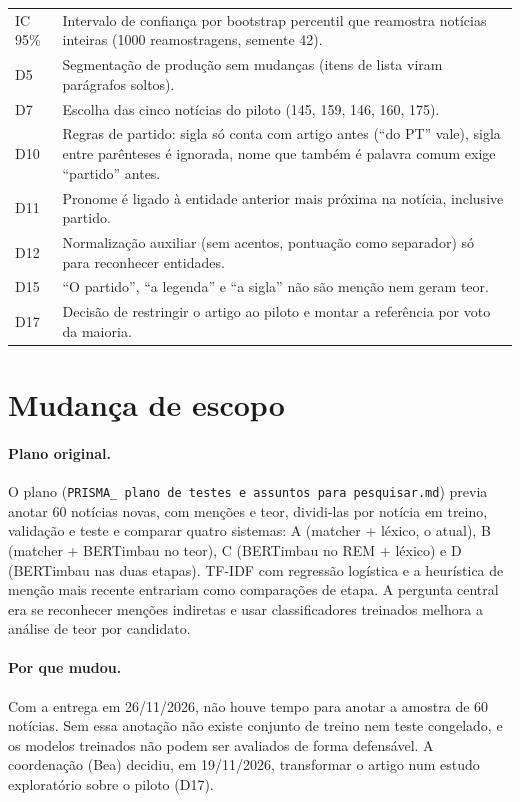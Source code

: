 \documentclass[11pt,a4paper]{article}
\begin{document}
\begin{table}[H]
\begin{tabularx}{\textwidth}{@{}p{3.6cm}L@{}}
IC 95\% & Intervalo de confiança por bootstrap percentil que reamostra notícias inteiras (1000 reamostragens, semente 42). \\
D5 & Segmentação de produção sem mudanças (itens de lista viram parágrafos soltos). \\
D7 & Escolha das cinco notícias do piloto (145, 159, 146, 160, 175). \\
D10 & Regras de partido: sigla só conta com artigo antes (\enquote{do PT} vale), sigla entre parênteses é ignorada, nome que também é palavra comum exige \enquote{partido} antes. \\
D11 & Pronome é ligado à entidade anterior mais próxima na notícia, inclusive partido. \\
D12 & Normalização auxiliar (sem acentos, pontuação como separador) só para reconhecer entidades. \\
D15 & \enquote{O partido}, \enquote{a legenda} e \enquote{a sigla} não são menção nem geram teor. \\
D17 & Decisão de restringir o artigo ao piloto e montar a referência por voto da maioria. \\
\bottomrule
\end{tabularx}
\end{table}

\section{Mudança de escopo}\label{sec:escopo}

\paragraph{Plano original.} O plano (\texttt{PRISMA\_ plano de testes e assuntos para pesquisar.md}) previa anotar 60 notícias novas, com menções e teor, dividi-las por notícia em treino, validação e teste e comparar quatro sistemas: A (matcher + léxico, o atual), B (matcher + BERTimbau no teor), C (BERTimbau no REM + léxico) e D (BERTimbau nas duas etapas). TF-IDF com regressão logística e a heurística de menção mais recente entrariam como comparações de etapa. A pergunta central era se reconhecer menções indiretas e usar classificadores treinados melhora a análise de teor por candidato.

\paragraph{Por que mudou.} Com a entrega em 26/11/2026, não houve tempo para anotar a amostra de 60 notícias. Sem essa anotação não existe conjunto de treino nem teste congelado, e os modelos treinados não podem ser avaliados de forma defensável. A coordenação (Bea) decidiu, em 19/11/2026, transformar o artigo num estudo exploratório sobre o piloto (D17).
\end{document}
